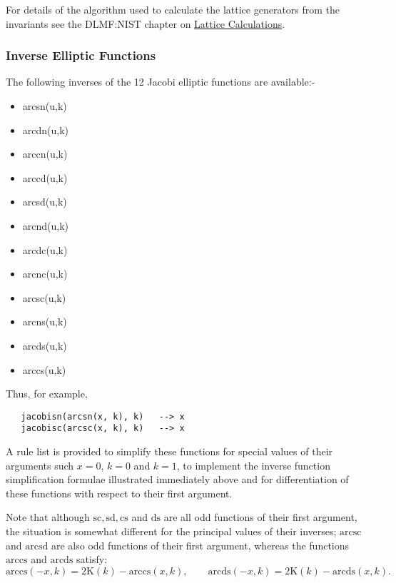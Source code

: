 For details of the algorithm used to calculate the lattice generators from the
invariants see the DLMF:NIST chapter on
\href{https://dlmf.nist.gov/23.22#ii}{Lattice Calculations}.

\subsubsection{Inverse Elliptic Functions}
The following inverses of the 12 Jacobi elliptic functions are available:-
\hypertarget{INVELL}{}
\begin{itemize}
\item arcsn(u,k)
\item arcdn(u,k)
\item arccn(u,k)
\item arccd(u,k)
\item arcsd(u,k)
\item arcnd(u,k)
\item arcdc(u,k)
\item arcnc(u,k)
\item arcsc(u,k)
\item arcns(u,k)
\item arcds(u,k)
\item arccs(u,k)
\end{itemize}

Thus, for example,
\begin{verbatim}
   jacobisn(arcsn(x, k), k)   --> x
   jacobisc(arcsc(x, k), k)   --> x
\end{verbatim}

A rule list is provided to simplify these functions for special values of their
arguments such $x=0$, $k=0$ and $k=1$, to implement the inverse function
simplification formulae illustrated immediately above and for differentiation
of these functions with respect to their first argument.

Note that although $\mathrm{sc}, \mathrm{sd}, \mathrm{cs}$ and $\mathrm{ds}$
are all odd functions of their first argument, the situation is somewhat
different for the principal values of their inverses;  $\mathrm{arcsc}$ and
$\mathrm{arcsd}$ are also odd functions of their first argument, whereas
the functions $\mathrm{arccs}$ and $\mathrm{arcds}$ satisfy:
\[ \mathrm{arccs}(-x, k) = 2\mathrm{K}(k)-\mathrm{arccs}(x, k),\qquad
\mathrm{arcds}(-x, k) = 2\mathrm{K}(k)-\mathrm{arcds}(x, k).\]

